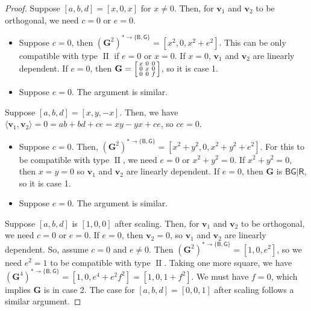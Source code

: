 \documentclass[11pt]{article}
\DeclareMathOperator{\typeii}{II}
\newcommand{\db}{\mathsf{B}}
\newcommand{\dg}{\mathsf{G}}
\newcommand{\dr}{\mathsf{R}}
\newcommand{\domres}[1]{
  ^{*\to\{#1\}}
}
\begin{document}
\begin{proof}
  Suppose $[a, b, d] = [x, 0, x]$ for $x \ne 0$.
  Then, for $\mathbf{v}_1$ and $\mathbf{v}_2$ to be orthogonal, we need $c = 0$ or $e = 0$.
  \begin{itemize}
    \item 
      Suppose $c = 0$, then $(\mathbf{G}^2)\domres{\db, \dg} = [x^2, 0, x^2 + e^2]$.
      This can be only compatible with type $\typeii$ if $e = 0$ or $x = 0$.
      If $x = 0$, $\mathbf{v}_1$ and $\mathbf{v}_2$ are linearly dependent.
      If $e = 0$, then $\mathbf{G} = \begin{bsmallmatrix}
          x & 0 & 0 \\
          0 & x & 0 \\
          0 & 0 & f
      \end{bsmallmatrix}$, so it is case 1.
    \item 
      Suppose $e = 0$. The argument is similar. 
  \end{itemize}

  Suppose $[a, b, d] = [x, y, -x]$.
  Then, we have $\langle \mathbf{v}_1, \mathbf{v}_2 \rangle = 0 = ab + bd + ce = xy - yx + ce$, so $ce = 0$.
  \begin{itemize}
    \item Suppose $c = 0$.
      Then, $(\mathbf{G}^2)\domres{\db, \dg} = [x^2 + y^2, 0, x^2 + y^2 + e^2]$.
      For this to be compatible with type $\typeii$, we need $e = 0$ or $x^2 + y^2 = 0$.
      If $x^2 + y^2 = 0$, then $x = y = 0$ so $\mathbf{v}_1$ and $\mathbf{v}_2$ are linearly dependent.
      If $e = 0$, then $\mathbf{G}$ is $\db \dg | \dr$, so it is case 1.

    \item Suppose $e = 0$. The argument is similar.
  \end{itemize}

  Suppose $[a, b, d]$ is $[1, 0, 0]$ after scaling.
  Then, for $\mathbf{v}_1$ and $\mathbf{v}_2$ to be orthogonal, we need $c = 0$ or $e = 0$.
  If $e = 0$, then $\mathbf{v}_2 = 0$, so $\mathbf{v}_1$ and $\mathbf{v}_2$ are linearly dependent.
  So, assume $c = 0$ and $e \ne 0$. 
  Then $(\mathbf{G}^2)\domres{\db, \dg} = [1, 0, e^2]$, so we need $e^2 = 1$ to be compatible with type $\typeii$.
  Taking one more square, we have $(\mathbf{G}^4)\domres{\db, \dg} = [1, 0, e^4 + e^2f^2] = [1, 0, 1 + f^2]$.
  We must have $f = 0$, which implies $\mathbf{G}$ is in case 2.
  The case for $[a, b, d] = [0, 0, 1]$ after scaling follows a similar argument.


\end{proof}
\end{document}
